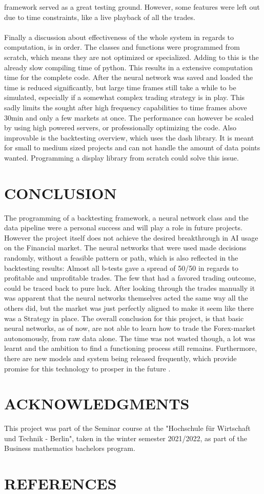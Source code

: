 \documentclass{article}
\begin{document}
framework served as a great testing ground. However, some features were left out due to time constraints, like a live playback of all the trades. \\~\\ Finally a discussion about effectiveness of the whole system in regards to computation, is in order. The classes and functions were programmed from scratch, which means they are not optimized or specialized. Adding to this is the already slow compiling time of python. This results in a extensive computation time for the complete code. After the neural network was saved and loaded the time is reduced significantly, but large time frames still take a while to be simulated, especially if a somewhat complex trading strategy is in play. This sadly limits the sought after high frequency capabilities to time frames above 30min and only a few markets at once. The performance can however be scaled by using high powered servers, or professionally optimizing the code. Also improvable is the backtesting overview, which uses the dash library. It is meant for small to medium sized projects and can not handle the amount of data points wanted. Programming a display library from scratch could solve this issue.   


\section{CONCLUSION}
The programming of a backtesting framework, a neural network class and the data pipeline were a personal success and will play a role in future projects. However the project itself does not achieve the desired breakthrough in AI usage on the Financial market. The neural networks that were used made decisions randomly, without a feasible pattern or path, which is also reflected in the backtesting results: Almost all b-tests gave a spread of 50/50 in regards to profitable and unprofitable trades. The few that had a favored trading outcome, could be traced back to pure luck. After looking through the trades manually it was apparent that the neural networks themselves acted the same way all the others did, but the market was just perfectly aligned to make it seem like there was a Strategy in place. The overall conclusion for this project, is that basic neural networks, as of now, are not able to learn how to trade the Forex-market autonomously, from raw data alone. The time was not wasted though, a lot was learnt and the ambition to find a functioning process still remains. Furthermore, there are new models and system being released frequently, which provide promise for this technology to prosper in the future \cite{betterbot}. 


\section{ACKNOWLEDGMENTS}
This project was part of the Seminar course at the "Hochschule für Wirtschaft und Technik - Berlin", taken in the winter semester 2021/2022, as part of the Business mathematics bachelors program.
\section{REFERENCES}
 


\end{document}
